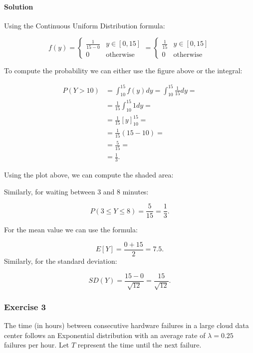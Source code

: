 \documentclass[
]{article}
\makeatletter
\newcommand*\pandocbounded[1]{%
  \sbox\pandoc@box{#1}%
  \Gscale@div\@tempa{\textheight}{\dimexpr\ht\pandoc@box+\dp\pandoc@box\relax}%
  \Gscale@div\@tempb{\linewidth}{\wd\pandoc@box}%
  \ifdim\@tempb\p@<\@tempa\p@\let\@tempa\@tempb\fi%
  \ifdim\@tempa\p@<\p@\scalebox{\@tempa}{\usebox\pandoc@box}%
  \else\usebox{\pandoc@box}%
  \fi%
}
\makeatother
\begin{document}
\paragraph{Solution}\label{solution-1}

Using the Continuous Uniform Distribution formula:

\[f(y)=\begin{cases}
\frac{1}{15-0} & y\in[0,15]\\
0 & \text{otherwise}
\end{cases}=\begin{cases}
\frac{1}{15} & y\in[0,15]\\
0 & \text{otherwise}
\end{cases}\]

\pandocbounded{}

To compute the probability we can either use the figure above or the
integral:

\[\begin{aligned}
  P(Y>10)&=\int_{10}^{15}f(y)dy=\int_{10}^{15}\frac{1}{15}dy=\\
  &=\frac{1}{15}\int_{10}^{15}1dy=\\
  &=\frac{1}{15}[y]_{10}^{15}=\\
  &=\frac{1}{15}(15-10)=\\
  &=\frac{5}{15}=\\
  &=\frac{1}{3}.
\end{aligned}\]

Using the plot above, we can compute the shaded area:

\pandocbounded{}

Similarly, for waiting between 3 and 8 minutes:

\[P(3\leq Y\leq 8)=\frac{5}{15}=\frac{1}{3}.\]

For the mean value we can use the formula:

\[E[Y]=\frac{0+15}{2}=7.5.\] Similarly, for the standard deviation:

\[SD(Y)=\frac{15-0}{\sqrt{12}}=\frac{15}{\sqrt{12}}.\]

\subsubsection{Exercise 3}\label{exercise-3}

The time (in hours) between consecutive hardware failures in a large
cloud data center follows an Exponential distribution with an average
rate of \(\lambda = 0.25\) failures per hour. Let \(T\) represent the
time until the next failure.
\end{document}
